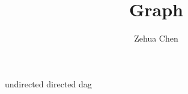 \documentclass[11pt, letterpaper]{report}
\title{Graph}
\author{Zehua Chen}
\begin{document}
  \maketitle
  \tableofcontents

  \setmainstyles

  {undirected}
  {directed}
  {dag}
\end{document}
